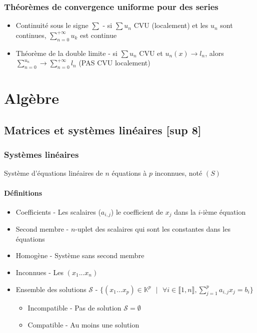 \documentclass[openany]{book}
\begin{document}
\subsection{Théorèmes de convergence uniforme pour des series}

\begin{itemize}
    \item Continuité sous le signe $\sum$ - si $\sum u_n$ CVU (localement) et les $u_n$ sont continues, $\sum_{n=0}^{+\infty} u_k$ est continue
    \item Théorème de la double limite - si $\sum u_n$ CVU et $u_n(x) \longrightarrow l_n$, alors $\sum_{n=0}^{u_n} \longrightarrow \sum_{n=0}^{+\infty} l_n$ (PAS CVU localement)
\end{itemize}

\clearpage

\chapter{Algèbre}

\section{Matrices et systèmes linéaires [sup 8]}
\subsection{Systèmes linéaires}
Système d'équations linéaires de $n$ équations à $p$ inconnues, noté $(S)$

\subsubsection{Définitions}
\begin{itemize}
    \item Coefficients - Les scalaires ($a_{i, j}$) le coefficient de $x_j$ dans la $i$-ième équation
    \item Second membre - $n$-uplet des scalaires qui sont les constantes dans les équations
    \item Homogène - Système sans second membre
    \item Inconnues - Les $(x_1...x_n)$
    \item Ensemble des solutions $\mathcal{S}$ - $\{(x_1...x_p)\in\mathbb{K}^p \text{ } | \text{ } \forall i \in \llbracket 1, n \rrbracket, \sum_{j=1}^{p}a_{i, j}x_j = b_i \}$
    \begin{itemize}
        \item Incompatible - Pas de solution $\mathcal{S} = \emptyset$
        \item Compatible - Au moins une solution
    \end{itemize}
\end{itemize}
\end{document}
